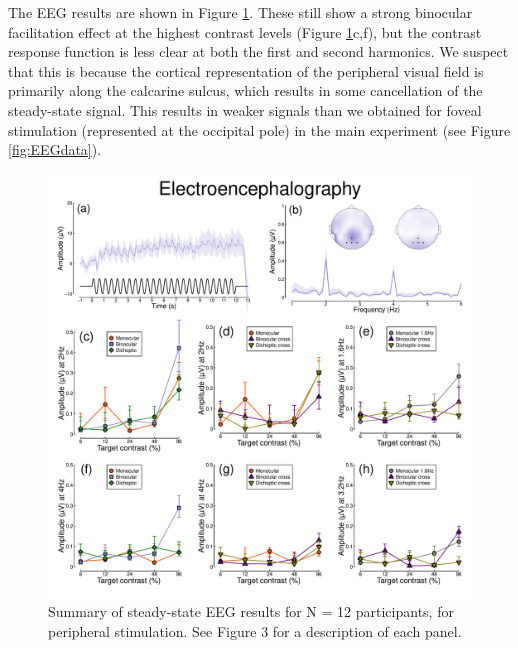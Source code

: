 \documentclass[
]{article}
\begin{document}
The EEG results are shown in Figure \ref{fig:appendixfig2}. These still show a strong binocular facilitation effect at the highest contrast levels (Figure \ref{fig:appendixfig2}c,f), but the contrast response function is less clear at both the first and second harmonics. We suspect that this is because the cortical representation of the peripheral visual field is primarily along the calcarine sulcus, which results in some cancellation of the steady-state signal. This results in weaker signals than we obtained for foveal stimulation (represented at the occipital pole) in the main experiment (see Figure \ref{fig:EEGdata}).

\begin{figure}

{\centering \includegraphics{Figures/EEGdataRep} 

}

\caption{Summary of steady-state EEG results for N = 12 participants, for peripheral stimulation. See Figure 3 for a description of each panel.}\label{fig:appendixfig2}
\end{figure}
\end{document}
